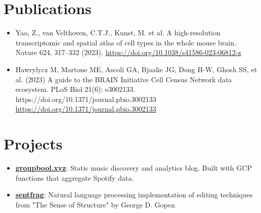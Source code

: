 \documentclass[letterpaper,11pt]{article}
\newcommand{\resumeItem}[1]{
  \item\small{
    {#1 \vspace{-2pt}}
  }
}
\newcommand{\resumeSubItem}[1]{\resumeItem{#1}\vspace{-4pt}}
\newcommand{\resumeSubHeadingListStart}{\begin{itemize}[leftmargin=*]}
\newcommand{\resumeSubHeadingListEnd}{\end{itemize}}
\begin{document}
\section{Publications}
  \resumeSubHeadingListStart
    \resumeSubItem{Yao, Z., van Velthoven, C.T.J., Kunst, M. et al. A high-resolution transcriptomic and spatial atlas of cell types in the whole mouse brain. Nature 624, 317–332 (2023). \href{https://doi.org/10.1038/s41586-023-06812-z}{https://doi.org/10.1038/s41586-023-06812-z}}
    \resumeSubItem{Hawrylycz M, Martone ME, Ascoli GA, Bjaalie JG, Dong H-W, Ghosh SS, et al. (2023) A guide to the BRAIN Initiative Cell Census Network data ecosystem. PLoS Biol 21(6): e3002133. https://doi.org/10.1371/journal.pbio.3002133 \href{https://doi.org/10.1371/journal.pbio.3002133}{https://doi.org/10.1371/journal.pbio.3002133}}
  \resumeSubHeadingListEnd

\section{Projects}
  \resumeSubHeadingListStart
    \resumeSubItem{\href{https://groupbool.xyz}{\textbf{groupbool.xyz}}: Static music discovery and analytics blog. Built with GCP functions that aggregate Spotify data.}
    \resumeSubItem{\href{https://github.com/pbishwakarma/sentfrag}{\textbf{sentfrag}}: Natural language processing implementation of editing techniques from "The Sense of Structure" by George D. Gopen}
  \resumeSubHeadingListEnd


\end{document}
